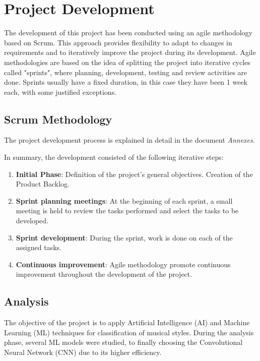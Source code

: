
\section{Project Development}

The development of this project has been conducted using an agile methodology based on Scrum. This approach provides flexibility to adapt to changes in requirements and to iteratively improve the project during its development.
Agile methodologies are based on the idea of splitting the project into iterative cycles called "sprints", where planning, development, testing and review activities are done.
Sprints usually have a fixed duration, in this case they have been 1 week each, with some justified exceptions.

\subsection{Scrum Methodology}
The project development process is explained in detail in the document \textit{Annexes}.

In summary, the development consisted of the following iterative steps:

\begin{enumerate}
\item \textbf{Initial Phase}: Definition of the project's general objectives. Creation of the Product Backlog.

\item \textbf{Sprint planning meetings}: At the beginning of each sprint, a small meeting is held to review the tasks performed and select the tasks to be developed.

\item \textbf{Sprint development}: During the sprint, work is done on each of the assigned tasks.

\item \textbf{Continuous improvement}: Agile methodology promote continuous improvement throughout the development of the project.
\end{enumerate}

\subsection{Analysis}

The objective of the project is to apply Artificial Intelligence (AI) and Machine Learning (ML) techniques for classification of musical styles.
During the analysis phase, several ML models were studied, to finally choosing the Convolutional Neural Network (CNN) due to its higher efficiency.

